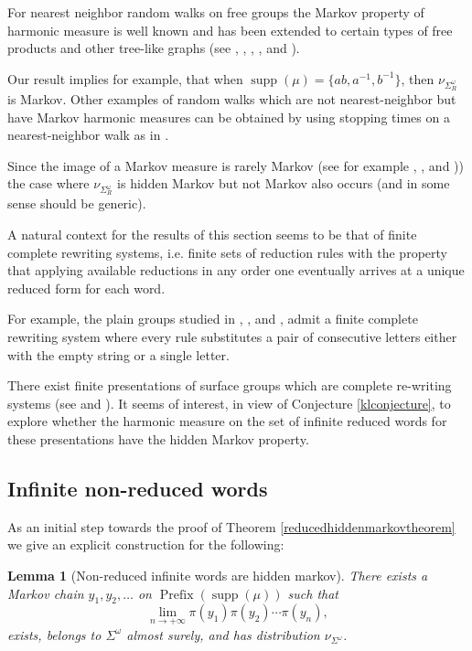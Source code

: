 \documentclass{article}
\newtheorem{lemma}{Lemma}
\DeclareMathOperator{\supp}{supp}
\DeclareMathOperator{\prefix}{Prefix}
\begin{document}
For nearest neighbor random walks on free groups the Markov property of harmonic measure is well known and has been extended to certain types of free products and other tree-like graphs (see \cite{ledrappier-free}, \cite{gerl-woess}, \cite{picardello-woess}, \cite{mairesse}, and \cite{mairesse-matheus}).

Our result implies for example, that when \(\supp(\mu) = \lbrace ab,a^{-1},b^{-1}\rbrace\), then \(\nu_{\Sigma^\omega_R}\) is Markov.   Other examples of random walks which are not nearest-neighbor but have Markov harmonic measures can be obtained by using stopping times on a nearest-neighbor walk as in \cite{forghani}.

Since the image of a Markov measure is rarely Markov (see for example \cite{burke-rosenblatt}, \cite{kelly}, and \cite{gurvits-ledoux})) the case where \(\nu_{\Sigma^\omega_R}\) is hidden Markov but not Markov also occurs (and in some sense should be generic).

A natural context for the results of this section seems to be that of finite complete rewriting systems, i.e. finite sets of reduction rules with the property that applying available reductions in any order one eventually arrives at a unique reduced form for each word.

For example, the plain groups studied in \cite{bordenave-dubail}, \cite{mairesse}, and \cite{mairesse-matheus}, admit a finite complete rewriting system where every rule substitutes a pair of consecutive letters either with the empty string or a single letter.

There exist finite presentations of surface groups which are complete re-writing systems (see \cite{chenadec} and \cite{hermiller}).  It seems of interest, in view of Conjecture \ref{klconjecture}, to explore whether the harmonic measure on the set of infinite reduced words for these presentations have the hidden Markov property.

\subsection{Infinite non-reduced words}

As an initial step towards the proof of Theorem \ref{reducedhiddenmarkovtheorem}  we give an explicit construction for the following:
\begin{lemma}[Non-reduced infinite words are hidden markov]\label{nonreducedlemma}
 There exists a Markov chain \(y_1,y_2,\ldots\) on \(\prefix(\supp(\mu))\) such that
 \[\lim\limits_{n \to +\infty}\pi(y_1)\pi(y_2)\cdots \pi(y_n),\]
 exists, belongs to \(\Sigma^\omega\) almost surely, and has distribution \(\nu_{\Sigma^\omega}\).
\end{lemma}
\end{document}
